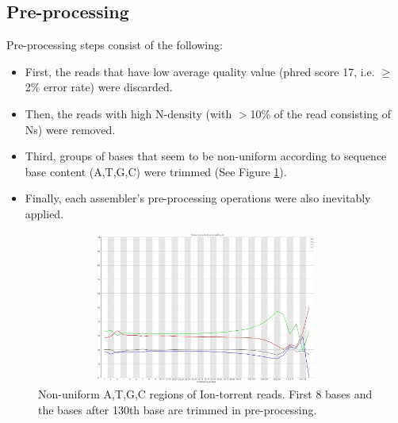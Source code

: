 \documentclass{llncs}
\begin{document}
\subsection{Pre-processing} 
Pre-processing steps consist of the following: 
\begin{itemize}
\item First, the reads that have low average quality value (phred score 17, i.e. $\geq$2\% error rate) were discarded. 
\item Then, the reads with high N-density (with $>$10\% of the read consisting of Ns) were removed. 
\item Third, groups of bases that seem to be non-uniform according to sequence base content (A,T,G,C) were trimmed (See Figure \ref{nonuniformATGC}). 
\item Finally, each assembler's pre-processing operations were also inevitably applied.
\end{itemize}

\begin{figure}[htbp]
\centerline{\includegraphics[width=12cm, height=5cm]{ionTorrentFastqc.jpg}}
\caption{Non-uniform A,T,G,C regions of Ion-torrent reads. First 8 bases and the bases after 130th base are trimmed in pre-processing.}
\label{nonuniformATGC}
\end{figure}
\end{document}
